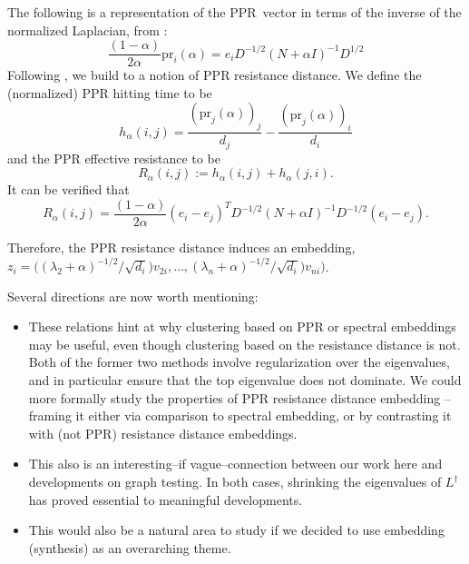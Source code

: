 \documentclass{article}
\newcommand{\1}{\mathbb{I}}
\newcommand{\Linv}{L^{\dagger}}
\theoremstyle{alden}
\theoremstyle{aldenthm}
\theoremstyle{definition}
\theoremstyle{remark}
\begin{document}
The following is a representation of the \textrm{PPR}~vector in terms of the inverse of the normalized Laplacian, from \citep{chung10}:
\begin{equation*}
\frac{(1 - \alpha)}{2\alpha}\textrm{pr}_{i}(\alpha) = e_i D^{-1/2}\left(N + \alpha I\right)^{-1} D^{1/2}
\end{equation*}
Following \citep{chung10}, we build to a notion of \textrm{PPR} resistance distance. We define the (normalized) \textrm{PPR} hitting time to be
\begin{equation*}
h_{\alpha}(i,j) = \frac{(\textrm{pr}_{j}(\alpha))_j}{d_j} -  \frac{(\textrm{pr}_{j}(\alpha))_i}{d_i}
\end{equation*}
and the \textrm{PPR} effective resistance to be
\begin{equation*}
R_{\alpha}(i,j) := h_{\alpha}(i,j) + h_{\alpha}(j,i).
\end{equation*}
It can be verified that
\begin{equation*}
R_{\alpha}(i,j) = \frac{(1- \alpha)}{2\alpha} (e_i - e_j)^T D^{-1/2} (N + \alpha I)^{-1} D^{-1/2} (e_i - e_j).
\end{equation*}

Therefore, the \textrm{PPR} resistance distance induces an embedding, $z_i = \bigl( (\lambda_2 + \alpha)^{-1/2}/\sqrt{d_i})v_{2i}, \ldots, (\lambda_n + \alpha)^{-1/2}/\sqrt{d_i})v_{ni} \bigr)$. 

Several directions are now worth mentioning:
\begin{itemize}
	\item These relations hint at why clustering based on PPR or spectral embeddings may be useful, even though clustering based on the resistance distance is not. Both of the former two methods involve regularization over the eigenvalues, and in particular ensure that the top eigenvalue does not dominate. We could more formally study the properties of \textrm{PPR} resistance distance embedding -- framing it either via comparison to spectral embedding, or by contrasting it with (not \textrm{PPR}) resistance distance embeddings.
	\item This also is an interesting--if vague--connection between our work here and developments on graph testing. In both cases, shrinking the eigenvalues of $\Linv$ has proved essential to meaningful developments.
	\item This would also be a natural area to study if we decided to use embedding (synthesis) as an overarching theme.
\end{itemize}
\end{document}
